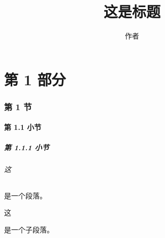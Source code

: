 \documentclass[UTF8, fontset=none]{ctexart}
\title{这是标题}
\author{作者}
\begin{document}
\maketitle
\tableofcontents
\newpage
\part{第 1 部分}
\section{第 1 节}
\subsection{第 1.1 小节}
\subsubsection{第 1.1.1 小节}
\paragraph{这} 是一个段落。
\subparagraph{这} 是一个子段落。
\end{document}
